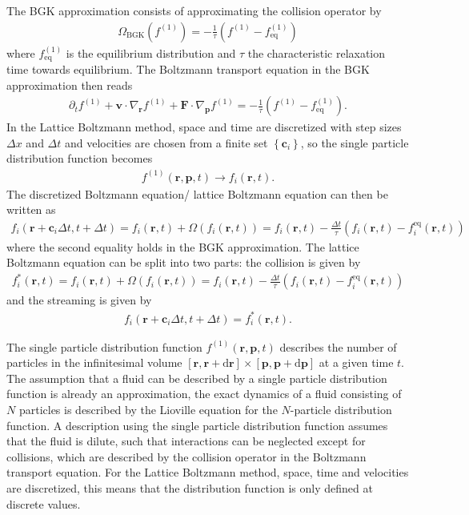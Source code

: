 \documentclass[a4paper,10pt,bibtotoc]{scrartcl}
\begin{document}
The BGK approximation consists of approximating the collision operator by
\begin{align}
 \Omega_\mathrm{BGK} (f^{(1)}) = -\frac{1}{\tau}\left(f^{(1)} - f^{(1)}_\mathrm{eq}\right)
\end{align}
where $f^{(1)}_\mathrm{eq}$ is the equilibrium distribution and $\tau$ the characteristic relaxation time towards equilibrium. The Boltzmann transport equation in the BGK approximation then reads
\begin{align}
    \partial_t f^{(1)} + \mathbf{v}\cdot\nabla_\mathbf{r}f^{(1)} + \mathbf{F}\cdot\nabla_\mathbf{p}f^{(1)} =
  -\frac{1}{\tau}\left(f^{(1)} - f^{(1)}_\mathrm{eq}\right).
\end{align}
In the Lattice Boltzmann method, space and time are discretized with step sizes $\Delta x$ and $\Delta t$ and velocities are chosen from a finite set $\left\{\mathbf{c}_i\right\}$, so the single particle distribution function becomes
\begin{align}
 f^{(1)}(\mathbf{r},\mathbf{p},t) \rightarrow f_i(\mathbf{r},t).
\end{align}
The discretized Boltzmann equation/ lattice Boltzmann equation can then be written as
\begin{align}
 f_i(\mathbf{r}+\mathbf{c}_i\Delta t,t+\Delta t) = f_i(\mathbf{r},t) + \Omega\left(f_i(\mathbf{r},t)\right) = f_i(\mathbf{r},t) - \frac{\Delta t}{\tau}\left(f_i(\mathbf{r},t) - f_i^\mathrm{eq}(\mathbf{r},t)\right)
\end{align}
where the second equality holds in the BGK approximation. The lattice Boltzmann equation can be split into two parts: the collision is given by
\begin{align}
 f_i^*(\mathbf{r},t) = f_i(\mathbf{r},t) + \Omega\left(f_i(\mathbf{r},t)\right) = f_i(\mathbf{r},t) - \frac{\Delta t}{\tau}\left(f_i(\mathbf{r},t) - f_i^\mathrm{eq}(\mathbf{r},t)\right)
\end{align}
and the streaming is given by
\begin{align}
 f_i(\mathbf{r}+\mathbf{c}_i\Delta t,t+\Delta t) =f_i^*(\mathbf{r},t).
\end{align}

\noindent The single particle distribution function $f^{(1)}(\mathbf{r},\mathbf{p},t)$ describes the number of particles in the infinitesimal volume $\left[\mathbf{r},\mathbf{r}+\mathrm{d}\mathbf{r}\right]\times \left[\mathbf{p},\mathbf{p}+\mathrm{d}\mathbf{p}\right]$ at a given time $t$. The assumption that a fluid can be described by a single particle distribution function is already an approximation, the exact dynamics of a fluid consisting of $N$ particles is described by the Lioville equation for the $N$-particle distribution function. A description using the single particle distribution function assumes that the fluid is dilute, such that interactions can be neglected except for collisions, which are described by the collision operator in the Boltzmann transport equation. For the Lattice Boltzmann method, space, time and velocities are discretized, this means that the distribution function is only defined at discrete values. 
\text{ }\\
\text{ }
\end{document}
